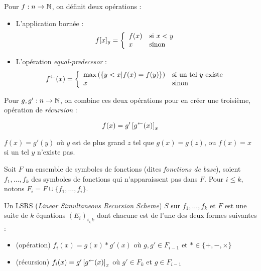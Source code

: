 		\begin{definition}
			\label{def:app_bornee_eq_pred}
			Pour $f : n \to \mathbb{N}$, on définit deux opérations :
			
			\begin{itemize}
				\item 	L'application bornée :
				\[
				f[x]_y = \left\lbrace \begin{array}{ll} 
					f(x) & \text{si $x<y$} \\
					x 	& \text{sinon}
				 \end{array} \right.
				\]
				
				\item 	L'opération \emph{equal-predecesor} :
				\[
				f^{\leftarrow}(x) = \left\lbrace \begin{array}{ll} 
					\max\left(\left\lbrace y < x | f(x) = f(y)\right\rbrace\right) & \text{si un tel $y$ existe} \\
					x	& \text{sinon}
				 \end{array} \right.
				\]
			\end{itemize}
			
			Pour $g, g' : n \to \mathbb{N}$, on combine ces deux opérations pour en créer une troisième, opération de \emph{récursion} :
			
			\[
			f(x) = g'\left[ g^{\leftarrow}(x) \right]_{x}
			\]
			
			$f(x) = g'(y)$ où $y$ est de plus grand $z$ tel que $g(x) = g(z)$, ou $f(x) = x$ si un tel $y$ n'existe pas.
		\end{definition}
		
		
		\begin{definition}[LSRS]
			\label{def:LSRS}
			Soit $F$ un ensemble de symboles de fonctions (dites \emph{fonctions de base}), soient $f_1, \dots, f_k$ des symboles de fonctions qui n'apparaissent pas dans $F$. Pour $i\leqslant k$, notons $F_i = F\cup \{f_1, \dots, f_i\}$. 
		
		Un LSRS (\emph{Linear Simultaneous Recursion Scheme}) $S$ sur $f_1, \dots, f_k$ et $F$ est une suite de $k$ équations $\left(E_i\right)_{i_\in k}$ dont chacune est de l'une des deux formes suivantes :
		
		\begin{itemize}
			\item 	(opération) 		$f_i(x) = g(x) * g'(x)$ où $g,g' \in F_{i-1}$ et $* \in \{+, -, \times \}$\footnotemark
			
			
			\item 	(récursion)			$f_i(x) = g'\left[ g^{\leftarrow}(x) \right]_{x}$ où $g' \in F_k$ et $g \in F_{i-1}$
		\end{itemize}
		
		\end{definition}
		
